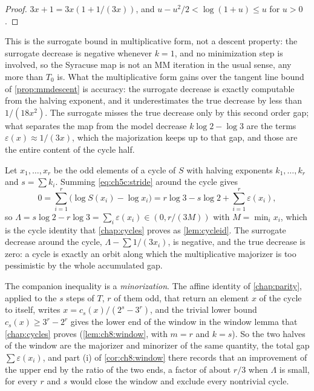 \begin{proof}
$3x+1=3x(1+1/(3x))$, and $u-u^2/2<\log(1+u)\le u$ for $u>0$.
\end{proof}

This is the surrogate bound in multiplicative form, not a descent property: the
surrogate decrease is negative whenever $k=1$, and no minimization step is
involved, so the Syracuse map is not an MM iteration in the usual sense, any
more than $T_0$ is. What the multiplicative form gains over the tangent line
bound of \cref{prop:mmdescent} is accuracy: the surrogate
decrease is exactly computable from the halving exponent, and it underestimates
the true decrease by less than $1/(18x^2)$.
The surrogate misses the true decrease only by this second order gap; what separates the map from the model decrease $k\log2-\log3$ are the terms $\varepsilon(x)\approx1/(3x)$, which the majorization keeps up to that gap, and those are the entire content of the cycle half.

\begin{proposition}\label{prop:ch5c:cyclemm}
Let $x_1,\dots,x_r$ be the odd elements of a cycle of $S$ with halving
exponents $k_1,\dots,k_r$ and $s=\sum k_i$. Summing \eqref{eq:ch5c:stride}
around the cycle gives
\[
  0=\sum_{i=1}^r\bigl(\log S(x_i)-\log x_i\bigr)
  =r\log3-s\log2+\sum_{i=1}^r\varepsilon(x_i),
\]
so $\Lambda=s\log2-r\log3=\sum_i\varepsilon(x_i)\in(0,r/(3M))$ with $M=\min_ix_i$, which is
the cycle identity that \cref{chap:cycles} proves as \cref{lem:cycleid}. The surrogate decrease around the cycle, $\Lambda-\sum
1/(3x_i)$, is negative, and the true decrease is zero: a cycle is exactly an
orbit along which the multiplicative majorizer is too pessimistic by the whole
accumulated gap.
\end{proposition}

The companion inequality is a \emph{minorization}. The affine identity of
\cref{chap:parity}, applied to the $s$ steps of $T$, $r$ of them odd, that return an element $x$ of the cycle to itself, writes $x=c_s(x)/(2^s-3^r)$, and the trivial lower
bound $c_s(x)\ge3^r-2^r$ gives the lower end of the window in the window lemma that \cref{chap:cycles} proves (\cref{lem:ch8:window}, with $m=r$ and $k=s$).
So the two halves of the window are the majorizer and
minorizer of the same quantity, the total gap $\sum\varepsilon(x_i)$, and
part (i) of \cref{cor:ch8:window} there records that an improvement of the upper end by the ratio of the two ends, a factor of about $r/3$ when $\Lambda$ is small, for every $r$ and $s$ would close the window and exclude every nontrivial cycle.

